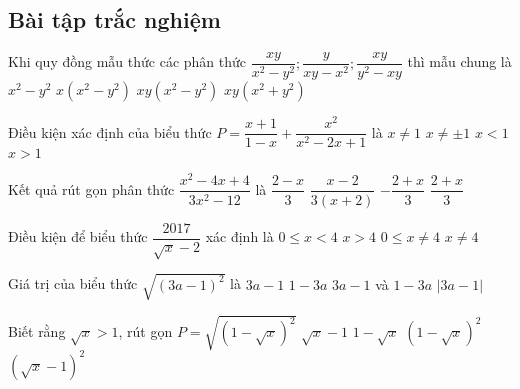\subsection{Bài tập trắc nghiệm}
\begin{bt}
Khi quy đồng mẫu thức các phân thức $\dfrac{xy}{x^2-y^2};\dfrac{y}{xy-x^2};\dfrac{xy}{y^2-xy}$ thì mẫu chung là
	\choice
	{$x^2-y^2$}
	{$x(x^2-y^2)$}
	{\True $xy(x^2-y^2)$}
	{$xy(x^2+y^2)$}
\end{bt}
\begin{bt}
	Điều kiện xác định của biểu thức $P=\dfrac{x+1}{1-x}+\dfrac{x^2}{x^2-2x+1}$ là
	\choice
	{\True $x\neq 1$}
	{$x\neq \pm 1$}
	{$x<1$}
	{$x>1$}
\end{bt}
\begin{bt}
	Kết quả rút gọn phân thức $\dfrac{x^2-4x+4}{3x^2-12}$ là
	\choice
	{$\dfrac{2-x}{3}$}
	{\True $\dfrac{x-2}{3(x+2)}$}
	{$-\dfrac{2+x}{3}$}
	{$\dfrac{2+x}{3}$}
	\end{bt}
    \begin{bt}
   	Điều kiện để biểu thức $\dfrac{2017}{\sqrt{x}-2}$ xác định là
   	\choice
   	{$0\leq x<4$}
   	{$x>4$}
   	{\True $0\leq x\neq 4$}
   	{$x\neq 4$}
   \end{bt} 
   \begin{bt}
   	Giá trị của biểu thức $\sqrt{(3a-1)^2}$ là
   	\choice
   	{$3a-1$}
   	{$1-3a$}
   	{$3a-1$ và $1-3a$}
   	{\True $|3a-1|$}
   \end{bt}
   \begin{bt}
   	Biết rằng $\sqrt{x}>1$, rút gọn $P=\sqrt{(1-\sqrt{x})^2}$
   	\choice
   	{\True $\sqrt{x}-1$}
   	{$1-\sqrt{x}$}
   	{$(1-\sqrt{x})^2$}
   	{$(\sqrt{x}-1)^2$}
   \end{bt}
   
